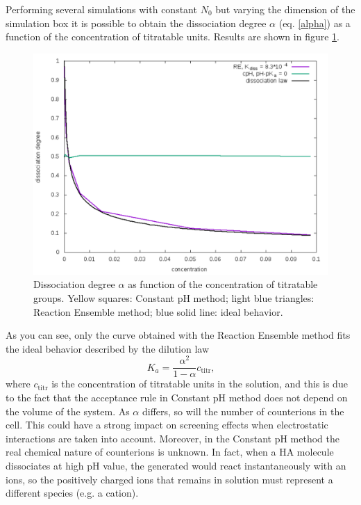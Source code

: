 \documentclass[
a4paper,                        %
11pt,                           %
twoside,                        %
footsepline,                    %
headsepline,                    %
headexclude,                    %
footexclude,                    %
pagesize,                       %
]{scrartcl}
\begin{document}
Performing several simulations with constant $N_0$ but varying the dimension of the simulation box it is possible to obtain the dissociation degree $\alpha$ (eq. \ref{alpha}) as a function of the concentration of titratable units. Results are shown in figure \ref{alpha_vs_C}.
\begin{figure}[tb]
	\centering
 	\includegraphics[scale=0.6]{figures/alpha_vs_C.pdf}
 	\caption{Dissociation degree $\alpha$ as function of the concentration of titratable groups. Yellow squares: Constant pH method; light blue triangles: Reaction Ensemble method; blue solid line: ideal behavior.}
 	\label{alpha_vs_C}
\end{figure}
As you can see, only the curve obtained with the Reaction Ensemble method fits the ideal behavior described by the dilution law
\begin{equation}
K_{a} = \frac{\alpha^2}{1 - \alpha}c_\text{titr}\text{,}
\end{equation}
where $c_\text{titr}$ is the concentration of titratable units in the solution, and this is due to the fact that the acceptance rule in Constant pH method does not depend on the volume of the system. As $\alpha$ differs, so will the number of counterions in the cell. This could have a strong impact on screening effects when electrostatic interactions are taken into account. Moreover, in the Constant pH method the real chemical nature of counterions is unknown. In fact, when a HA molecule dissociates at high pH value, the generated  would react instantaneously with an  ions, so the positively charged ions that remains in solution must represent a different species (e.g. a  cation).
\end{document}
